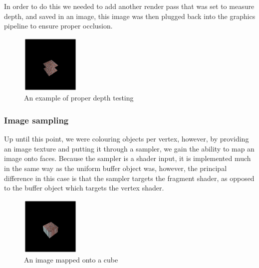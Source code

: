 \documentclass[../report.tex]{subfiles}
\begin{document}
In order to do this we needed to add another render pass that was set to measure depth, and saved in an image, this image was then plugged back into the graphics pipeline to ensure proper occlusion.

\begin{figure}[h]
    \centering
    \includegraphics[width=0.25\textwidth]{images/depth.png}
    \caption{An example of proper depth testing}
\end{figure}

\subsubsection{Image sampling}
Up until this point, we were colouring objects per vertex, however, by providing an image texture and putting it through a sampler, we gain the ability to map an image onto faces.
Because the sampler is a shader input, it is implemented much in the same way as the uniform buffer object was, however, the principal difference in this case is that the sampler targets the fragment shader, as opposed to the buffer object which targets the vertex shader.

\begin{figure}[h]
    \centering
    \includegraphics[width=0.25\textwidth]{images/cube.png}
    \caption{An image mapped onto a cube}
\end{figure}
\end{document}

